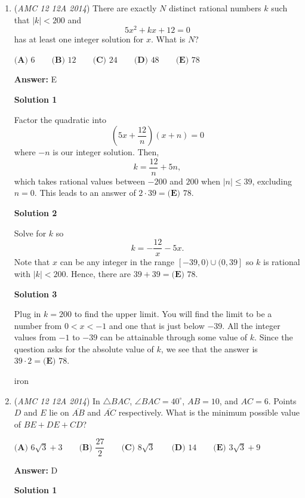 \begin{enumerate}
 


	\item (\textit{AMC 12 12A 2014}) There are exactly $N$ distinct rational numbers $k$ such that $|k|<200$ and 
 \[5x^2+kx+12=0\] has at least one integer solution for $x$.  What is $N$?


 $\textbf{(A) }6\qquad \textbf{(B) }12\qquad \textbf{(C) }24\qquad \textbf{(D) }48\qquad \textbf{(E) }78\qquad$

 \textbf{Answer: }E



\textbf{Solution 1}

Factor the quadratic into
 \[\left(5x + \frac{12}{n}\right)\left(x + n\right) = 0\]where $-n$ is our integer solution. Then, 
 \[k = \frac{12}{n} + 5n,\]which takes rational values between $-200$ and $200$ when $|n| \leq 39$, excluding $n = 0$. This leads to an answer of $2 \cdot 39 = \boxed{\textbf{(E) } 78}$.

 



\textbf{Solution 2}

Solve for $k$ so 
 \[k=-\frac{12}{x}-5x.\]  Note that $x$ can be any integer in the range $[-39,0)\cup(0,39]$  so $k$ is rational with $\lvert k\rvert<200$.  Hence, there are $39+39=\boxed{\textbf{(E) } 78}.$




\textbf{Solution 3}

Plug in $k=200$ to find the upper limit. You will find the limit to be a number from $0<x<-1$ and one that is just below $-39.$ All the integer values from $-1$ to $-39$ can be attainable through some value of $k$. Since the question asks for the absolute value of $k$, we see that the answer is $39\cdot2 = \boxed{\textbf{(E)  }78.}$

 iron

 


	\item (\textit{AMC 12 12A 2014}) In $\triangle BAC$, $\angle BAC=40^\circ$, $AB=10$, and $AC=6$.  Points $D$ and $E$ lie on $\overline{AB}$ and $\overline{AC}$ respectively.  What is the minimum possible value of $BE+DE+CD$?


 $\textbf{(A) }6\sqrt 3+3\qquad \textbf{(B) }\dfrac{27}2\qquad \textbf{(C) }8\sqrt 3\qquad \textbf{(D) }14\qquad \textbf{(E) }3\sqrt 3+9\qquad$

 \textbf{Answer: }D



\textbf{Solution 1}


\end{enumerate}
